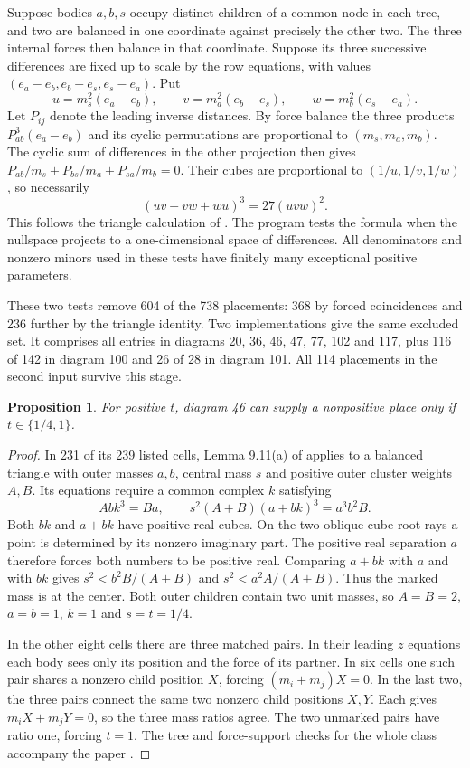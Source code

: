 \documentclass[11pt]{article}
\newtheorem{proposition}[theorem]{Proposition}
\begin{document}
Suppose bodies $a,b,s$ occupy distinct children of a common node in each tree, and two are balanced in one coordinate against precisely the other two. The three internal forces then balance in that coordinate. Suppose its three successive differences are fixed up to scale by the row equations, with values $(e_a-e_b,e_b-e_s,e_s-e_a)$. Put
\[
 u=m_s^2(e_a-e_b),\qquad v=m_a^2(e_b-e_s),\qquad w=m_b^2(e_s-e_a).
\]
Let $P_{ij}$ denote the leading inverse distances. By force balance the three products $P_{ab}^3(e_a-e_b)$ and its cyclic permutations are proportional to $(m_s,m_a,m_b)$. The cyclic sum of differences in the other projection then gives $P_{ab}/m_s+P_{bs}/m_a+P_{sa}/m_b=0$. Their cubes are proportional to $(1/u,1/v,1/w)$, so necessarily
\[
                      (uv+vw+wu)^3=27(uvw)^2.
\]
This follows the triangle calculation of \cite[Lemma 9.13]{Tomar}. The program tests the formula when the nullspace projects to a one-dimensional space of differences. All denominators and nonzero minors used in these tests have finitely many exceptional positive parameters.

These two tests remove 604 of the 738 placements: 368 by forced coincidences and 236 further by the triangle identity. Two implementations give the same excluded set. It comprises all entries in diagrams 20, 36, 46, 47, 77, 102 and 117, plus 116 of 142 in diagram 100 and 26 of 28 in diagram 101. All 114 placements in the second input survive this stage.

\newpage
\begin{proposition}
For positive $t$, diagram 46 can supply a nonpositive place only if $t\in\{1/4,1\}$.
\end{proposition}
\begin{proof}
In 231 of its 239 listed cells, Lemma 9.11(a) of \cite{Tomar} applies to a balanced triangle with outer masses $a,b$, central mass $s$ and positive outer cluster weights $A,B$. Its equations require a common complex $k$ satisfying
\[
 Abk^3=Ba,\qquad s^2(A+B)(a+bk)^3=a^3b^2B.
\]
Both $bk$ and $a+bk$ have positive real cubes. On the two oblique cube-root rays a point is determined by its nonzero imaginary part. The positive real separation $a$ therefore forces both numbers to be positive real. Comparing $a+bk$ with $a$ and with $bk$ gives $s^2<b^2B/(A+B)$ and $s^2<a^2A/(A+B)$. Thus the marked mass is at the center. Both outer children contain two unit masses, so $A=B=2$, $a=b=1$, $k=1$ and $s=t=1/4$.

In the other eight cells there are three matched pairs. In their leading $z$ equations each body sees only its position and the force of its partner. In six cells one such pair shares a nonzero child position $X$, forcing $(m_i+m_j)X=0$. In the last two, the three pairs connect the same two nonzero child positions $X,Y$. Each gives $m_i X+m_jY=0$, so the three mass ratios agree. The two unmarked pairs have ratio one, forcing $t=1$. The tree and force-support checks for the whole class accompany the paper \cite{Supplement}.
\end{proof}
\end{document}
